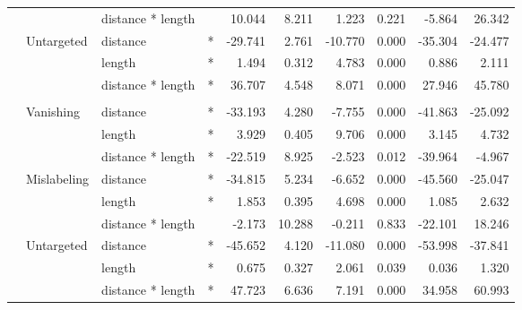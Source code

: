 \begin{longtable}[t]{llllrrrrrr}
\cmidrule{3-10}\nopagebreak
\hspace{1em} &  & distance * length &  & 10.044 & 8.211 & 1.223 & 0.221 & -5.864 & 26.342\\
\cmidrule{2-10}\nopagebreak
\hspace{1em} & Untargeted & distance & * & -29.741 & 2.761 & -10.770 & 0.000 & -35.304 & -24.477\\
\cmidrule{3-10}\nopagebreak
\hspace{1em} &  & length & * & 1.494 & 0.312 & 4.783 & 0.000 & 0.886 & 2.111\\
\cmidrule{3-10}\nopagebreak
\hspace{1em} &  & distance * length & * & 36.707 & 4.548 & 8.071 & 0.000 & 27.946 & 45.780\\
\cmidrule{1-10}\pagebreak[0]
\addlinespace[0.3em]
\multicolumn{10}{l}{\textbf{Cascade R-CNN}}\\
\hspace{1em} & Vanishing & distance & * & -33.193 & 4.280 & -7.755 & 0.000 & -41.863 & -25.092\\
\cmidrule{3-10}\nopagebreak
\hspace{1em} &  & length & * & 3.929 & 0.405 & 9.706 & 0.000 & 3.145 & 4.732\\
\cmidrule{3-10}\nopagebreak
\hspace{1em} &  & distance * length & * & -22.519 & 8.925 & -2.523 & 0.012 & -39.964 & -4.967\\
\cmidrule{2-10}\nopagebreak
\hspace{1em} & Mislabeling & distance & * & -34.815 & 5.234 & -6.652 & 0.000 & -45.560 & -25.047\\
\cmidrule{3-10}\nopagebreak
\hspace{1em} &  & length & * & 1.853 & 0.395 & 4.698 & 0.000 & 1.085 & 2.632\\
\cmidrule{3-10}\nopagebreak
\hspace{1em} &  & distance * length &  & -2.173 & 10.288 & -0.211 & 0.833 & -22.101 & 18.246\\
\cmidrule{2-10}\nopagebreak
\hspace{1em} & Untargeted & distance & * & -45.652 & 4.120 & -11.080 & 0.000 & -53.998 & -37.841\\
\cmidrule{3-10}\nopagebreak
\hspace{1em} &  & length & * & 0.675 & 0.327 & 2.061 & 0.039 & 0.036 & 1.320\\
\cmidrule{3-10}\nopagebreak
\hspace{1em} &  & distance * length & * & 47.723 & 6.636 & 7.191 & 0.000 & 34.958 & 60.993\\
\bottomrule
\end{longtable}
\endgroup{}

